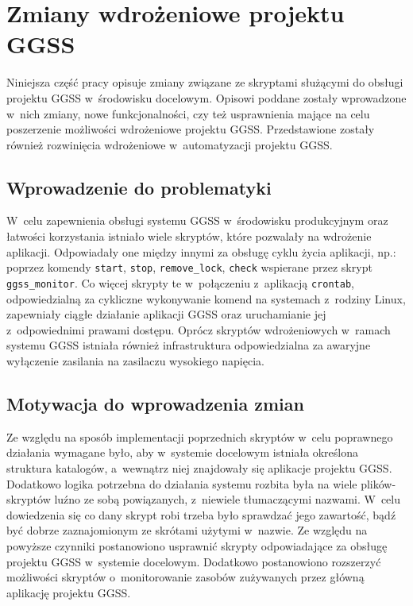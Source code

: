 \clearpage
\section{Zmiany wdrożeniowe projektu GGSS}
\label{ch:scripts}

Niniejsza część pracy opisuje zmiany związane ze skryptami służącymi do obsługi projektu GGSS w~środowisku docelowym. Opisowi poddane zostały wprowadzone w~nich zmiany, nowe funkcjonalności, czy też usprawnienia mające na celu poszerzenie możliwości wdrożeniowe projektu GGSS. Przedstawione zostały również rozwinięcia wdrożeniowe w~automatyzacji projektu GGSS.

\subsection{Wprowadzenie do problematyki}
W~celu zapewnienia obsługi systemu GGSS w~środowisku produkcyjnym oraz łatwości korzystania istniało wiele skryptów, które pozwalały na wdrożenie aplikacji. Odpowiadały one między innymi za obsługę cyklu życia aplikacji, np.: poprzez komendy \lstinline{start}, \lstinline{stop}, \lstinline{remove_lock}, \lstinline{check} wspierane przez skrypt \lstinline{ggss_monitor}. Co więcej skrypty te w~połączeniu z~aplikacją \lstinline{crontab}, odpowiedzialną za cykliczne wykonywanie komend na systemach z~rodziny Linux, zapewniały ciągłe działanie aplikacji GGSS oraz uruchamianie jej z~odpowiednimi prawami dostępu. Oprócz skryptów wdrożeniowych w~ramach systemu GGSS istniała również infrastruktura odpowiedzialna za awaryjne wyłączenie zasilania na zasilaczu wysokiego napięcia.

\subsection{Motywacja do wprowadzenia zmian}
\label{sec:scripts_motiv}
Ze względu na sposób implementacji poprzednich skryptów w~celu poprawnego działania wymagane było, aby w~systemie docelowym istniała określona struktura katalogów, a~wewnątrz niej znajdowały się aplikacje projektu GGSS. Dodatkowo logika potrzebna do działania systemu rozbita była na wiele plików-skryptów luźno ze sobą powiązanych, z~niewiele tłumaczącymi nazwami. W~celu dowiedzenia się co dany skrypt robi trzeba było sprawdzać jego zawartość, bądź być dobrze zaznajomionym ze skrótami użytymi w~nazwie. Ze względu na powyższe czynniki postanowiono usprawnić skrypty odpowiadające za obsługę projektu GGSS w~systemie docelowym. Dodatkowo postanowiono rozszerzyć możliwości skryptów o~monitorowanie zasobów zużywanych przez główną aplikację projektu GGSS.

